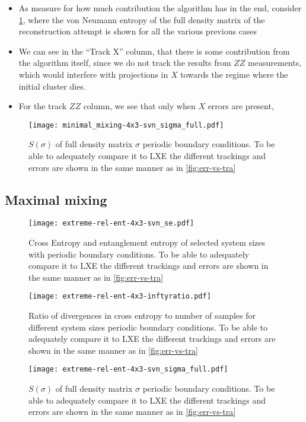\begin{itemize}
  \item As measure for how much contribution the algorithm has in the end,
    consider \cref{fig:min_mix-svn_sigma_full-4x3}, where the von Neumann
    entropy of the full density matrix of the reconstruction attempt is shown
    for all the various previous cases
  \item We can see in the \enquote{Track X} column, that there is some
    contribution from the algorithm itself, since we do not track the results
    from $ZZ$ measurements, which would interfere with projections in $X$
    towards the regime where the initial cluster dies. 
  \item For the track $ZZ$ column, we see that only when $X$ errors are
    present, 
\end{itemize}
\begin{figure}[H]
  \centering
  \texttt{[image: minimal\_mixing-4x3-svn\_sigma\_full.pdf]}
  \caption{$S(\sigma)$ of full density matrix $\sigma$ 
  periodic boundary conditions. To be able to adequately compare it to LXE the
different trackings and errors are shown in the same manner as in
\cref{fig:err-vs-tra}}
  \label{fig:min_mix-svn_sigma_full-4x3}
\end{figure}
\subsection{Maximal mixing}
\begin{figure}[H]
  \centering
  \texttt{[image: extreme-rel-ent-4x3-svn\_se.pdf]}
  \caption{Cross Entropy and entanglement entropy of selected system sizes with
  periodic boundary conditions. To be able to adequately compare it to LXE the
different trackings and errors are shown in the same manner as in
\cref{fig:err-vs-tra}}
  \label{fig:max_mix-svn_se-4x3}
\end{figure}
\begin{figure}[H]
  \centering
  \texttt{[image: extreme-rel-ent-4x3-inftyratio.pdf]}
  \caption{Ratio of divergences in cross entropy to number of samples for
    different system sizes
  periodic boundary conditions. To be able to adequately compare it to LXE the
different trackings and errors are shown in the same manner as in
\cref{fig:err-vs-tra}}
  \label{fig:max_mix-inftyratio-4x3}
\end{figure}
\begin{figure}[H]
  \centering
  \texttt{[image: extreme-rel-ent-4x3-svn\_sigma\_full.pdf]}
  \caption{$S(\sigma)$ of full density matrix $\sigma$ 
  periodic boundary conditions. To be able to adequately compare it to LXE the
different trackings and errors are shown in the same manner as in
\cref{fig:err-vs-tra}}
  \label{fig:max_mix-svn_sigma_full-4x3}
\end{figure}

